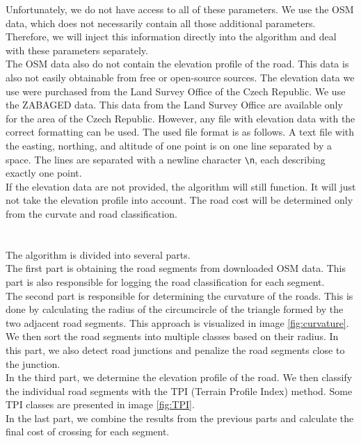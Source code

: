             Unfortunately, we do not have access to all of these parameters. We use the OSM data, which does not necessarily contain all those additional parameters. Therefore, we will inject this information directly into the algorithm and deal with these parameters separately.\\
            The OSM data also do not contain the elevation profile of the road. This data is also not easily obtainable from free or open-source sources. The elevation data we use were purchased from the Land Survey Office of the Czech Republic. We use the ZABAGED\cite{ZABAGED} data. This data from the Land Survey Office are available only for the area of the Czech Republic. However, any file with elevation data with the correct formatting can be used. The used file format is as follows. A text file with the easting, northing, and altitude of one point is on one line separated by a space. The lines are separated with a newline character \texttt{\textbackslash n}, each describing exactly one point.\\
            If the elevation data are not provided, the algorithm will still function. It will just not take the elevation profile into account. The road cost will be determined only from the curvate and road classification.\\\\
        \\
            The algorithm is divided into several parts.\\
            The first part is obtaining the road segments from downloaded OSM data. This part is also responsible for logging the road classification for each segment.\\
            The second part is responsible for determining the curvature of the roads. This is done by calculating the radius of the circumcircle of the triangle formed by the two adjacent road segments. This approach is visualized in image \ref{fig:curvature}. We then sort the road segments into multiple classes based on their radius. In this part, we also detect road junctions and penalize the road segments close to the junction.\\
            In the third part, we determine the elevation profile of the road. We then classify the individual road segments with the TPI (Terrain Profile Index) method. Some TPI classes are presented in image \ref{fig:TPI}.\\
            In the last part, we combine the results from the previous parts and calculate the final cost of crossing for each segment.
